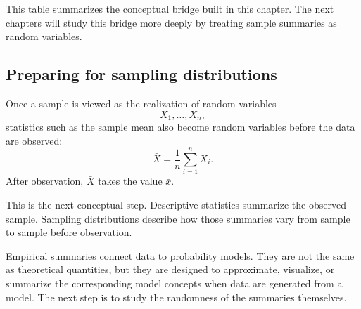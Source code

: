 This table summarizes the conceptual bridge built in this chapter. The next
chapters will study this bridge more deeply by treating sample summaries
as random variables.

\subsection*{Preparing for sampling distributions}

Once a sample is viewed as the realization of random variables
\[
X_1,
\ldots,X_n,
\]
statistics such as the sample mean also become random variables before the data
are observed:
\[
\bar{X}=\frac1n\sum_{i=1}^n X_i.
\]
After observation, \(\bar{X}\) takes the value \(\bar{x}\).

This is the next conceptual step. Descriptive statistics summarize the observed
sample. Sampling distributions describe how those summaries vary from sample to
sample before observation.

\begin{summarybox}
Empirical summaries connect data to probability models. They are not the same as
theoretical quantities, but they are designed to approximate, visualize, or
summarize the corresponding model concepts when data are generated from a model.
The next step is to study the randomness of the summaries themselves.
\end{summarybox}
